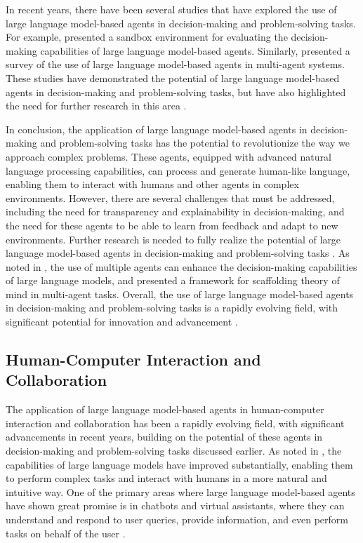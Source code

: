 \documentclass[11pt,a4paper]{article}
\begin{document}
In recent years, there have been several studies that have explored the use of large language model-based agents in decision-making and problem-solving tasks. For example, \cite{arxiv:2308.04026} presented a sandbox environment for evaluating the decision-making capabilities of large language model-based agents. Similarly, \cite{arxiv:2402.01680} presented a survey of the use of large language model-based agents in multi-agent systems. These studies have demonstrated the potential of large language model-based agents in decision-making and problem-solving tasks, but have also highlighted the need for further research in this area \cite{arxiv:2401.02777}.

In conclusion, the application of large language model-based agents in decision-making and problem-solving tasks has the potential to revolutionize the way we approach complex problems. These agents, equipped with advanced natural language processing capabilities, can process and generate human-like language, enabling them to interact with humans and other agents in complex environments. However, there are several challenges that must be addressed, including the need for transparency and explainability in decision-making, and the need for these agents to be able to learn from feedback and adapt to new environments. Further research is needed to fully realize the potential of large language model-based agents in decision-making and problem-solving tasks \cite{arxiv:2406.04692}. As noted in \cite{arxiv:2404.01023}, the use of multiple agents can enhance the decision-making capabilities of large language models, and \cite{arxiv:2407.07086} presented a framework for scaffolding theory of mind in multi-agent tasks. Overall, the use of large language model-based agents in decision-making and problem-solving tasks is a rapidly evolving field, with significant potential for innovation and advancement \cite{arxiv:2303.18223}.


\subsection{Human-Computer Interaction and Collaboration}


The application of large language model-based agents in human-computer interaction and collaboration has been a rapidly evolving field, with significant advancements in recent years, building on the potential of these agents in decision-making and problem-solving tasks discussed earlier. As noted in \cite{arxiv:2206.07682}, the capabilities of large language models have improved substantially, enabling them to perform complex tasks and interact with humans in a more natural and intuitive way. One of the primary areas where large language model-based agents have shown great promise is in chatbots and virtual assistants, where they can understand and respond to user queries, provide information, and even perform tasks on behalf of the user \cite{arxiv:2309.07870}. 
\end{document}
